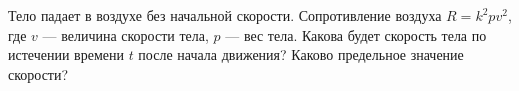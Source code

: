 Тело падает в воздухе без начальной скорости. Сопротивление
воздуха $R=k^2 pv^2$, где $v$ --- величина скорости тела,
$p$ --- вес тела. Какова будет скорость тела по истечении времени $t$
после начала движения? Каково предельное значение скорости?
